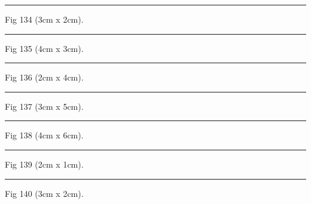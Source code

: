 \documentclass[a4paper,11pt]{article}
\begin{document}
\begin{swarmwrap}%
  \begin{minipage}[t]{3cm}
    \centering
    \rule{\linewidth}{2cm}
    {\footnotesize Fig 134 (3cm x 2cm).}
  \end{minipage}%
\end{swarmwrap}%
\swarmwrapnext
\lipsum[134]%

\begin{swarmwrap}%
  \begin{minipage}[t]{4cm}
    \centering
    \rule{\linewidth}{3cm}
    {\footnotesize Fig 135 (4cm x 3cm).}
  \end{minipage}%
\end{swarmwrap}%
\swarmwrapnext
\lipsum[135]%

\begin{swarmwrap}%
  \begin{minipage}[t]{2cm}
    \centering
    \rule{\linewidth}{4cm}
    {\footnotesize Fig 136 (2cm x 4cm).}
  \end{minipage}%
\end{swarmwrap}%
\swarmwrapnext
\lipsum[136]%

\begin{swarmwrap}%
  \begin{minipage}[t]{3cm}
    \centering
    \rule{\linewidth}{5cm}
    {\footnotesize Fig 137 (3cm x 5cm).}
  \end{minipage}%
\end{swarmwrap}%
\swarmwrapnext
\lipsum[137]%

\begin{swarmwrap}%
  \begin{minipage}[t]{4cm}
    \centering
    \rule{\linewidth}{6cm}
    {\footnotesize Fig 138 (4cm x 6cm).}
  \end{minipage}%
\end{swarmwrap}%
\swarmwrapnext
\lipsum[138]%

\begin{swarmwrap}%
  \begin{minipage}[t]{2cm}
    \centering
    \rule{\linewidth}{1cm}
    {\footnotesize Fig 139 (2cm x 1cm).}
  \end{minipage}%
\end{swarmwrap}%
\swarmwrapnext
\lipsum[139]%

\begin{swarmwrap}%
  \begin{minipage}[t]{3cm}
    \centering
    \rule{\linewidth}{2cm}
    {\footnotesize Fig 140 (3cm x 2cm).}
  \end{minipage}%
\end{swarmwrap}%
\swarmwrapnext
\lipsum[140]%
\end{document}
